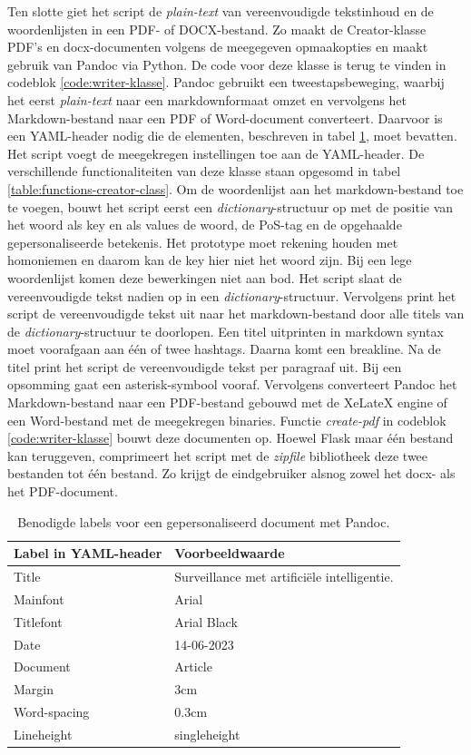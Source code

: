 Ten slotte giet het script de \textit{plain-text} van vereenvoudigde tekstinhoud en de woordenlijsten in een PDF- of DOCX-bestand. Zo maakt de Creator-klasse PDF's en docx-documenten volgens de meegegeven opmaakopties en maakt gebruik van Pandoc via Python. De code voor deze klasse is terug te vinden in codeblok \ref{code:writer-klasse}. Pandoc gebruikt een tweestapsbeweging, waarbij het eerst \textit{plain-text} naar een markdownformaat omzet en vervolgens het Markdown-bestand naar een PDF of Word-document converteert. Daarvoor is een YAML-header nodig die de elementen, beschreven in tabel \ref{table:personalized-pdf-word-document-with-pandoc}, moet bevatten. Het script voegt de meegekregen instellingen toe aan de YAML-header. De verschillende functionaliteiten van deze klasse staan opgesomd in tabel \ref{table:functions-creator-class}. Om de woordenlijst aan het markdown-bestand toe te voegen, bouwt het script eerst een \textit{dictionary}-structuur op met de positie van het woord als key en als values de woord, de PoS-tag en de opgehaalde gepersonaliseerde betekenis. Het prototype moet rekening houden met homoniemen en daarom kan de key hier niet het woord zijn. Bij een lege woordenlijst komen deze bewerkingen niet aan bod. Het script slaat de vereenvoudigde tekst nadien op in een \textit{dictionary}-structuur. Vervolgens print het script de vereenvoudigde tekst uit naar het markdown-bestand door alle titels van de \textit{dictionary}-structuur te doorlopen. Een titel uitprinten in markdown syntax moet voorafgaan aan één of twee hashtags. Daarna komt een breakline. Na de titel print het script de vereenvoudigde tekst per paragraaf uit. Bij een opsomming gaat een asterisk-symbool vooraf. Vervolgens converteert Pandoc het Markdown-bestand naar een PDF-bestand gebouwd met de XeLateX engine of een Word-bestand met de meegekregen binaries. Functie \textit{create-pdf} in codeblok \ref{code:writer-klasse} bouwt deze documenten op. Hoewel Flask maar één bestand kan teruggeven, comprimeert het script met de \textit{zipfile} bibliotheek deze twee bestanden tot één bestand. Zo krijgt de eindgebruiker alsnog zowel het docx- als het PDF-document. 

\begin{table}[H]
	\begin{tabular}{ | m{5cm}| m{5cm} | }
		\hline
		\textbf{Label in YAML-header} & \textbf{Voorbeeldwaarde} \\ \hline
		Title & Surveillance met artificiële intelligentie. \\ \hline
		Mainfont & Arial \\ \hline 
		Titlefont & Arial Black \\ \hline
		Date & 14-06-2023 \\ \hline 
		Document & Article \\ \hline
		Margin & 3cm \\ \hline
		Word-spacing & 0.3cm \\ \hline 
		Lineheight & singleheight \\ \hline
	\end{tabular}
	\caption{Benodigde labels voor een gepersonaliseerd document met Pandoc.}
	\label{table:personalized-pdf-word-document-with-pandoc}
\end{table}

